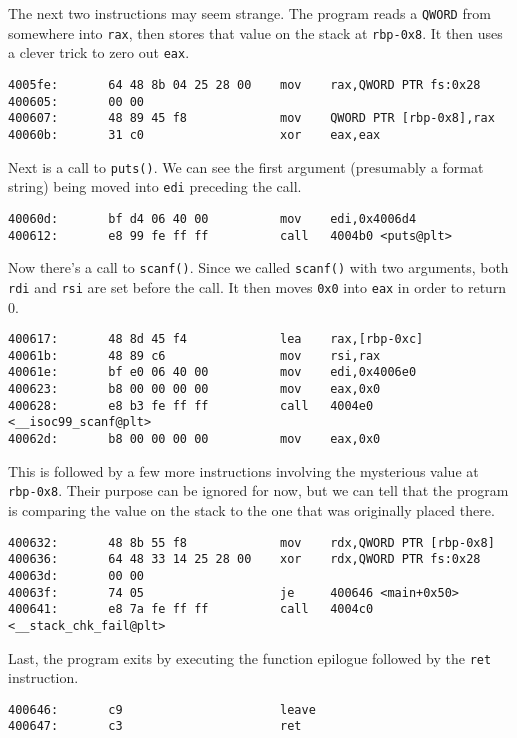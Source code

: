 \documentclass{article}
\begin{document}
The next two instructions may seem strange. The program reads a \texttt{QWORD}
from somewhere into \texttt{rax}, then stores that value on the stack at
\texttt{rbp-0x8}. It then uses a clever trick to zero out \texttt{eax}.
\begin{lstlisting}
4005fe:       64 48 8b 04 25 28 00    mov    rax,QWORD PTR fs:0x28
400605:       00 00 
400607:       48 89 45 f8             mov    QWORD PTR [rbp-0x8],rax
40060b:       31 c0                   xor    eax,eax
\end{lstlisting}

Next is a call to \texttt{puts()}. We can see the first argument (presumably a
format string) being moved into \texttt{edi} preceding the call.
\begin{lstlisting}
40060d:       bf d4 06 40 00          mov    edi,0x4006d4
400612:       e8 99 fe ff ff          call   4004b0 <puts@plt>
\end{lstlisting}

Now there's a call to \texttt{scanf()}. Since we called \texttt{scanf()} with
two arguments, both \texttt{rdi} and \texttt{rsi} are set before the call. It
then moves \texttt{0x0} into \texttt{eax} in order to return 0.

\begin{lstlisting}
400617:       48 8d 45 f4             lea    rax,[rbp-0xc]
40061b:       48 89 c6                mov    rsi,rax
40061e:       bf e0 06 40 00          mov    edi,0x4006e0
400623:       b8 00 00 00 00          mov    eax,0x0
400628:       e8 b3 fe ff ff          call   4004e0 <__isoc99_scanf@plt>
40062d:       b8 00 00 00 00          mov    eax,0x0
\end{lstlisting}

This is followed by a few more instructions involving the mysterious value at
\texttt{rbp-0x8}. Their purpose can be ignored for now, but we can tell that the
program is comparing the value on the stack to the one that was originally
placed there.
\begin{lstlisting}
400632:       48 8b 55 f8             mov    rdx,QWORD PTR [rbp-0x8]
400636:       64 48 33 14 25 28 00    xor    rdx,QWORD PTR fs:0x28
40063d:       00 00 
40063f:       74 05                   je     400646 <main+0x50>
400641:       e8 7a fe ff ff          call   4004c0 <__stack_chk_fail@plt>
\end{lstlisting}

Last, the program exits by executing the function epilogue followed by the
\texttt{ret} instruction.
\begin{lstlisting}
400646:       c9                      leave  
400647:       c3                      ret    
\end{lstlisting}
\end{document}
